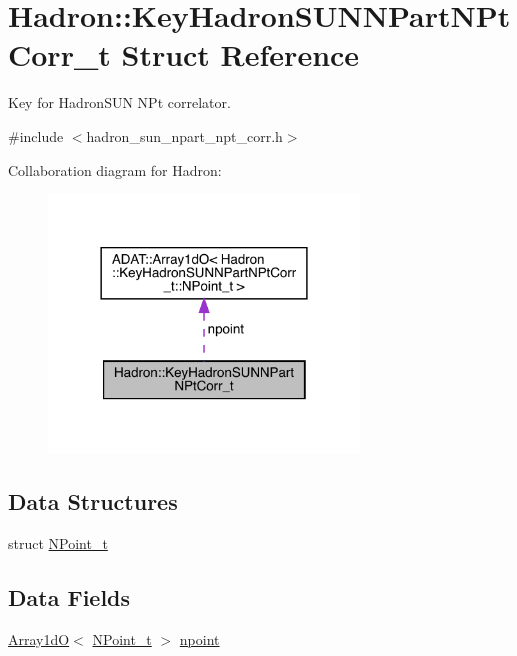 \hypertarget{structHadron_1_1KeyHadronSUNNPartNPtCorr__t}{}\section{Hadron\+:\+:Key\+Hadron\+S\+U\+N\+N\+Part\+N\+Pt\+Corr\+\_\+t Struct Reference}
\label{structHadron_1_1KeyHadronSUNNPartNPtCorr__t}


Key for Hadron\+S\+UN N\+Pt correlator.  




{\ttfamily \#include $<$hadron\+\_\+sun\+\_\+npart\+\_\+npt\+\_\+corr.\+h$>$}



Collaboration diagram for Hadron\+:\nopagebreak
\begin{figure}[H]
\begin{center}
\leavevmode
\includegraphics[width=234pt]{da/d33/structHadron_1_1KeyHadronSUNNPartNPtCorr__t__coll__graph}
\end{center}
\end{figure}
\subsection*{Data Structures}
\begin{DoxyCompactItemize}
\item 
struct \mbox{\hyperlink{structHadron_1_1KeyHadronSUNNPartNPtCorr__t_1_1NPoint__t}{N\+Point\+\_\+t}}
\end{DoxyCompactItemize}
\subsection*{Data Fields}
\begin{DoxyCompactItemize}
\item 
\mbox{\hyperlink{classADAT_1_1Array1dO}{Array1dO}}$<$ \mbox{\hyperlink{structHadron_1_1KeyHadronSUNNPartNPtCorr__t_1_1NPoint__t}{N\+Point\+\_\+t}} $>$ \mbox{\hyperlink{structHadron_1_1KeyHadronSUNNPartNPtCorr__t_a1d5919dc89116837fc924188f3c604bc}{npoint}}
\end{DoxyCompactItemize}


